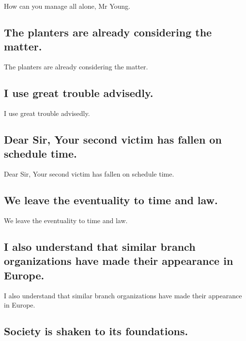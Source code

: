 \documentclass[]{article}
\begin{document}
How can you manage all alone, Mr Young.

\hypertarget{the-planters-are-already-considering-the-matter.}{%
\subsection{The planters are already considering the
matter.}\label{the-planters-are-already-considering-the-matter.}}

The planters are already considering the matter.

\hypertarget{i-use-great-trouble-advisedly.}{%
\subsection{I use great trouble
advisedly.}\label{i-use-great-trouble-advisedly.}}

I use great trouble advisedly.

\hypertarget{dear-sir-your-second-victim-has-fallen-on-schedule-time.}{%
\subsection{Dear Sir, Your second victim has fallen on schedule
time.}\label{dear-sir-your-second-victim-has-fallen-on-schedule-time.}}

Dear Sir, Your second victim has fallen on schedule time.

\hypertarget{we-leave-the-eventuality-to-time-and-law.}{%
\subsection{We leave the eventuality to time and
law.}\label{we-leave-the-eventuality-to-time-and-law.}}

We leave the eventuality to time and law.

\hypertarget{i-also-understand-that-similar-branch-organizations-have-made-their-appearance-in-europe.}{%
\subsection{I also understand that similar branch organizations have
made their appearance in
Europe.}\label{i-also-understand-that-similar-branch-organizations-have-made-their-appearance-in-europe.}}

I also understand that similar branch organizations have made their
appearance in Europe.

\hypertarget{society-is-shaken-to-its-foundations.}{%
\subsection{Society is shaken to its
foundations.}\label{society-is-shaken-to-its-foundations.}}
\end{document}

